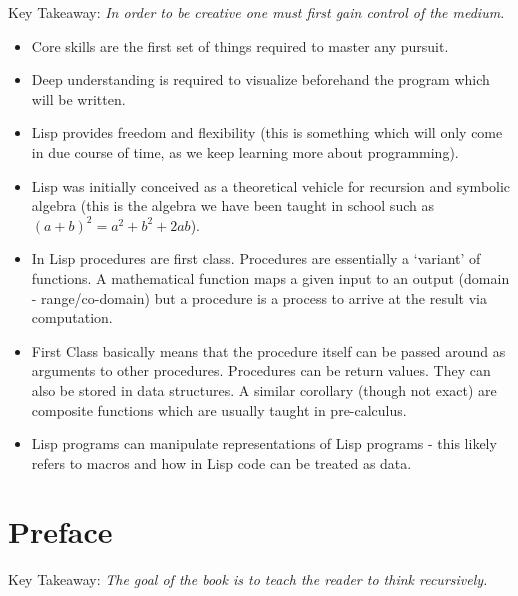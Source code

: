 \documentclass[11pt]{article}
\begin{document}
\vspace{1em}

Key Takeaway:
\emph{In order to be creative one must first gain control of the medium.}

\vspace{1em}

\begin{itemize}
\item Core skills are the first set of things required to master any pursuit.
\item Deep understanding is required to visualize beforehand the program which will be written.
\item Lisp provides freedom and flexibility (this is something which will only come in due course of time, as we keep
learning more about programming).
\item Lisp was initially conceived as a theoretical vehicle for recursion and symbolic algebra (this is the algebra we
have been taught in school such as \((a + b)^2 = a^2 + b^2 + 2ab\)).
\item In Lisp procedures are first class. Procedures are essentially a `variant' of functions. A mathematical function maps
a given input to an output (domain - range/co-domain) but a procedure is a process to arrive at the result via
computation.
\item First Class basically means that the procedure itself can be passed around as arguments to other procedures.
Procedures can be return values. They can also be stored in data structures. A similar corollary (though not exact)
are composite functions which are usually taught in pre-calculus.
\item Lisp programs can manipulate representations of Lisp programs - this likely refers to macros and how in Lisp code can
be treated as data.
\end{itemize}

\newpage
\section{Preface}
\label{sec:orgf6ad534}

Key Takeaway:
\emph{The goal of the book is to teach the reader to think recursively.}

\vspace{1em}
\end{document}
